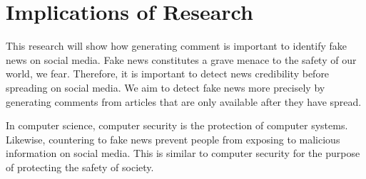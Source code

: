 \section{Implications of Research}
This research will show how generating comment is important to identify fake news on social media.
Fake news constitutes a grave menace to the safety of our world, we fear.
Therefore, it is important to detect news credibility before spreading on social media.
We aim to detect fake news more precisely by generating comments from articles that are only available after they have spread.

In computer science, computer security is the protection of computer systems.
Likewise, countering to fake news prevent people from exposing to malicious information on social media.
This is similar to computer security for the purpose of protecting the safety of society.